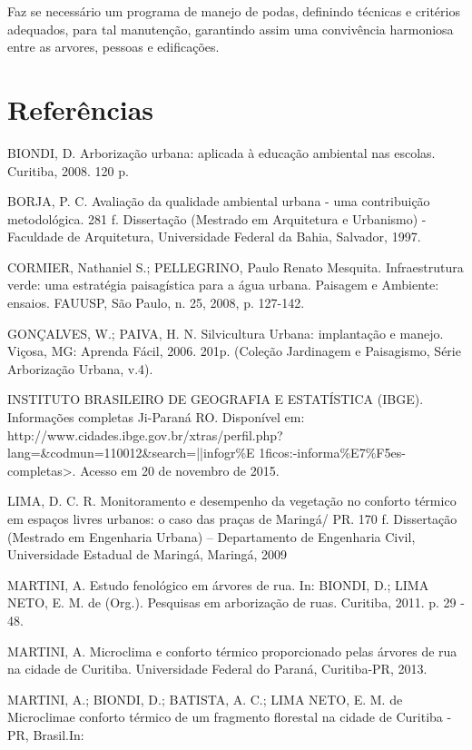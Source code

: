 \documentclass[article,12pt,onesidea,4paper,english,brazil]{abntex2}
\begin{document}
Faz se necessário um programa de manejo de podas, definindo técnicas e critérios adequados, para tal manutenção, garantindo assim uma convivência harmoniosa entre as arvores, pessoas e edificações.	
	
	\section*{Referências}
	
	\sloppy
	
	\noindent BIONDI, D. Arborização urbana: aplicada à educação ambiental nas escolas. Curitiba, 2008. 120 p.
	
	\noindent BORJA, P. C. Avaliação da qualidade ambiental urbana - uma contribuição metodológica. 281 f. Dissertação (Mestrado em Arquitetura e Urbanismo) - Faculdade de Arquitetura, Universidade Federal da Bahia, Salvador, 1997.
	
	\noindent 
	CORMIER, Nathaniel S.; PELLEGRINO, Paulo Renato Mesquita. Infraestrutura verde: uma estratégia paisagística para a água urbana. Paisagem e Ambiente: ensaios. FAUUSP, São Paulo, n. 25, 2008, p. 127-142.
	
	\noindent GONÇALVES, W.; PAIVA, H. N. Silvicultura Urbana: implantação e manejo. Viçosa, MG: Aprenda Fácil, 2006. 201p. (Coleção Jardinagem e Paisagismo, Série Arborização Urbana, v.4).
	
	
	\noindent INSTITUTO BRASILEIRO DE GEOGRAFIA E ESTATÍSTICA (IBGE). Informações
	completas Ji-Paraná RO. Disponível em: http://www.cidades.ibge.gov.br/xtras/perfil.php?lang=\&codmun=110012\&search=||infogr\%E 1ficos:-informa\%E7\%F5es-completas>. Acesso em 20 de novembro de 2015.
	
	\noindent LIMA, D. C. R. Monitoramento e desempenho da vegetação no conforto térmico em espaços livres urbanos: o caso das praças de Maringá/ PR. 170 f. Dissertação (Mestrado em Engenharia Urbana) – Departamento de Engenharia Civil, Universidade Estadual de Maringá, Maringá, 2009
	
	\noindent MARTINI, A. Estudo fenológico em árvores de rua. In: BIONDI, D.; LIMA NETO, E. M. de (Org.). Pesquisas em arborização de ruas. Curitiba, 2011. p. 29 - 48.
	
\noindent MARTINI, A. Microclima e conforto térmico proporcionado pelas árvores de rua na cidade de Curitiba. Universidade Federal do Paraná, Curitiba-PR, 2013.

\noindent MARTINI, A.; BIONDI, D.; BATISTA, A. C.; LIMA NETO, E. M. de Microclimae
conforto térmico de um fragmento florestal na cidade de Curitiba - PR, Brasil.In:
\end{document}
